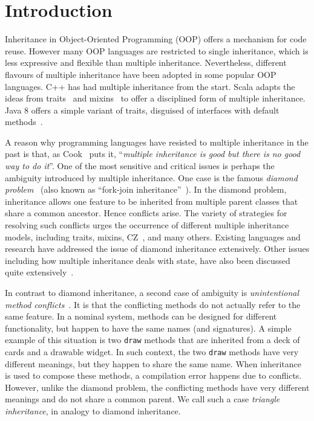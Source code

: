 \section{Introduction}
Inheritance in Object-Oriented Programming (OOP) offers a mechanism
for code reuse. However many OOP languages are restricted to single
inheritance, which is less expressive and flexible than multiple
inheritance. Nevertheless, different flavours of multiple inheritance
have been adopted in some popular OOP languages. C++ has had 
multiple inheritance from the start. Scala adapts the ideas from traits~\cite{scharli03traits,Ducasse:2006:TMF:1119479.1119483,Liquori08ftj}
and mixins~\cite{bracha90mixin,Flatt1998,van1996encapsulation,Ancona2003,Hendler86} to offer a disciplined form of multiple inheritance. Java 8 
offers a simple variant of traits, disguised of interfaces with default methods~\cite{goetz12fdefenders}.

A reason why programming languages have resisted to multiple
inheritance in the past is that, as Cook~\cite{Cook1987} puts it, 
``\emph{multiple inheritance is good but there is no good way to do it}''.
One of the most sensitive and critical issues is perhaps the ambiguity
introduced by multiple inheritance. One case is the famous
\textit{diamond problem}~\cite{Sak89dis,Singh1995} (also known as ``fork-join inheritance''~\cite{Sak89dis}). 
In the diamond problem, inheritance allows
one feature to be inherited from multiple parent classes that share a
common ancestor. Hence
conflicts arise. The variety of strategies for resolving such conflicts
urges the occurrence of different multiple inheritance models,
including traits, mixins, CZ~\cite{malayeri2009cz}, and many others. Existing
languages and research have addressed the issue of diamond inheritance extensively. Other issues
including how multiple inheritance deals with state, 
have also been discussed quite extensively~\cite{classless,malayeri2009cz,stroustrup1995}.

In contrast to diamond inheritance, a second case of ambiguity
is \textit{unintentional method conflicts}~\cite{scharli03traits}. It is that the conflicting 
methods do not actually refer to the same feature. 
In a nominal system, methods can be designed for different
functionality, but happen to have the same names (and signatures).
A simple example of this situation is two \lstinline{draw} methods that
are inherited from a deck of cards and a drawable widget. 
In such context, the two \lstinline{draw} methods have very different meanings, 
but they happen to share the same name.
When inheritance is used to compose these methods, a compilation 
error happens due to conflicts. However, unlike the diamond problem,
the conflicting methods have very different meanings and do not share a
common parent. We call such a case \textit{triangle inheritance}, in
analogy to diamond inheritance.

